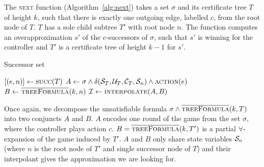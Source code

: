 The \textsc{next} function (Algorithm~\ref{alg:next}) takes a set $\sigma$ and its certificate tree $T$ of height $k$, such that there is exactly one outgoing edge, labelled $c$, from the root node of $T$.  $T$ has a sole child subtree $T'$ with root node $n$.  The function computes an overapproximation $s'$ of the $c$-successors of $\sigma$, such that $s'$ is winning for the controller and $T'$ is a certificate tree of height $k-1$ for $s'$.

\begin{algorithm}
   \caption{Successor set}\label{alg:next}
   \begin{algorithmic}[1]
        \State $[(e, n)] \gets \Call{succ}{T}$ 
            \State $A \gets \sigma \land \delta(\cS_T, \cU_T, \cC_T, \cS_n) \land \Call{action}{e}$\label{alg:strat:partition:Ai}
            \State $B \gets \textsc{$\overline{\mbox{treeFormula}}$}(k, n) $\label{alg:strat:partition:Bi}
            \State $\mathcal{I} \gets \Call{interpolate}{A, B}$ \label{alg:strat:partition:I}
            \State {} \label{alg:strat:partition:return}
        \EndFunction
    \end{algorithmic}
\end{algorithm}

Once again, we decompose the unsatisfiable formula $\sigma \land \textsc{$\overline{\mbox{treeFormula}}$}(k, T)$ into two conjuncts $A$ and $B$.  $A$ encodes one round of the game from the set $\sigma$, where the controller plays action $c$.  $B = \textsc{$\overline{\mbox{treeFormula}}$}(k, T')$ is a partial $\forall$-expansion of the game induced by $T'$.  $A$ and $B$ only share state variables $\mathcal{S}_n$ (where $n$ is the root node of $T'$ and single successor node of $T$) and their interpolant gives the approximation we are looking for.

